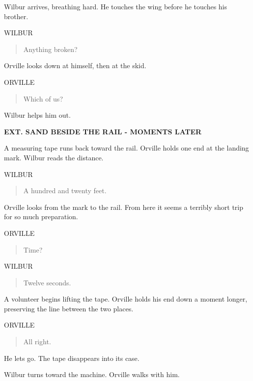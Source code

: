 \documentclass[12pt,letterpaper]{article}
\newcommand{\scene}[1]{\needspace{5\baselineskip}\vspace{8pt}\textbf{#1}\par}
\newcommand{\character}[1]{\needspace{4\baselineskip}\hspace*{2.2in}#1\par\nopagebreak}
\begin{document}
Wilbur arrives, breathing hard. He touches the wing before he touches his brother.\par

\character{WILBUR}
\begin{quote}Anything broken?\par\end{quote}

Orville looks down at himself, then at the skid.\par

\character{ORVILLE}
\begin{quote}Which of us?\par\end{quote}

Wilbur helps him out.\par

\scene{EXT. SAND BESIDE THE RAIL - MOMENTS LATER}

A measuring tape runs back toward the rail. Orville holds one end at the landing mark. Wilbur reads the distance.\par

\character{WILBUR}
\begin{quote}A hundred and twenty feet.\par\end{quote}

Orville looks from the mark to the rail. From here it seems a terribly short trip for so much preparation.\par

\character{ORVILLE}
\begin{quote}Time?\par\end{quote}

\character{WILBUR}
\begin{quote}Twelve seconds.\par\end{quote}

A volunteer begins lifting the tape. Orville holds his end down a moment longer, preserving the line between the two places.\par

\character{ORVILLE}
\begin{quote}All right.\par\end{quote}

He lets go. The tape disappears into its case.\par

Wilbur turns toward the machine. Orville walks with him.\par
\end{document}
